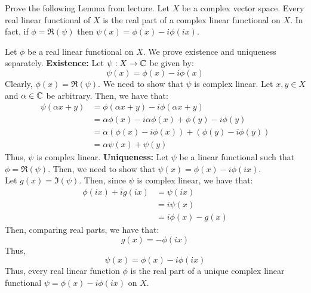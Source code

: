 \documentclass[12pt]{article}
\begin{document}
\begin{problem}{40}
    Prove the following Lemma from lecture. Let $X$ be a complex vector space. Every real linear functional of $X$ is the real part of a complex linear functional on $X$. In fact, if $\phi = \Re(\psi)$ then $\psi(x) = \phi(x) - i\phi(ix)$. 
\end{problem}
\begin{solution} 
    Let $\phi$ be a real linear functional on $X$. We prove existence and uniqueness separately. \bbni
    \textbf{Existence:} Let $\psi: X \to \mathbb C$ be given by: 
    \[ \psi(x) = \phi(x) - i\phi(x)\]
    Clearly, $\phi(x) = \Re(\psi)$. We need to show that $\psi$ is complex linear. \bbni
    Let $x, y \in X$ and $\alpha \in \mathbb C$ be arbitrary. Then, we have that:
    \begin{align*}
        \psi(\alpha x + y ) &= \phi(\alpha x + y) - i \phi(\alpha x + y) \\
        &= \alpha\phi(x)-i\alpha\phi(x) + \phi(y) - i\phi(y) \\
        &= \alpha(\phi(x) - i\phi(x)) + (\phi(y) - i\phi(y)) \\
        &= \alpha\psi(x) + \psi(y)
    \end{align*}
    Thus, $\psi$ is complex linear. \bbni
    \textbf{Uniqueness:} Let $\psi$ be a linear functional such that $\phi = \Re(\psi)$. Then, we need to show that $\psi(x) = \phi(x) - i\phi(ix)$. \\
    Let $g(x) = \Im(\psi)$. Then, since $\psi$ is complex linear, we have that: 
    \begin{align*}
        \phi(ix) + ig(ix) &= \psi(ix) \\ 
        &= i\psi(x) \\
        &= i\phi(x) - g(x)
    \end{align*}
    Then, comparing real parts, we have that: 
    \[ g(x) = -\phi(ix)\]
    Thus, 
    \[ \psi(x) = \phi(x) - i\phi(ix)\]
    Thus, every real linear function $\phi$ is the real part of a unique complex linear functional $\psi = \phi(x) -i\phi(ix)$ on $X$.
\end{solution}
\newpage 
\end{document}
